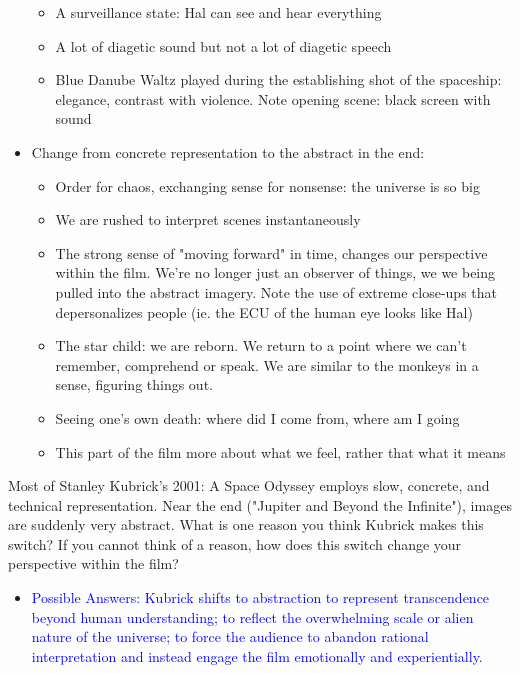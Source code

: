 \documentclass[11pt,fleqn]{book} %
\begin{document}
\begin{itemize}
\begin{itemize}
        \item A surveillance state: Hal can see and hear everything
        \item A lot of diagetic sound but not a lot of diagetic speech
        \item Blue Danube Waltz played during the establishing shot of the spaceship: elegance, contrast with violence. Note opening scene: black screen with sound
    \end{itemize}
    \item Change from concrete representation to the abstract in the end:
    \begin{itemize}
        \item Order for chaos, exchanging sense for nonsense: the universe is so big
        \item We are rushed to interpret scenes instantaneously
        \item The strong sense of "moving forward" in time, changes our perspective within the film. We're no longer just an observer of things, we we being pulled into the abstract imagery. Note the use of extreme close-ups that depersonalizes people (ie. the ECU of the human eye looks like Hal)
        \item The star child: we are reborn. We return to a point where we can't remember, comprehend or speak. We are similar to the monkeys in a sense, figuring things out. 
        \item Seeing one's own death: where did I come from, where am I going
        \item This part of the film more about what we feel, rather that what it means
    \end{itemize}
\end{itemize}
\begin{exercise}
Most of Stanley Kubrick's 2001: A Space Odyssey employs slow, concrete, and technical representation. Near the end ("Jupiter and Beyond the Infinite"), images are suddenly very abstract. What is one reason you think Kubrick makes this switch? If you cannot think of a reason, how does this switch change your perspective within the film?
\begin{itemize}
\item \textcolor{blue}{Possible Answers:  Kubrick shifts to abstraction to represent transcendence beyond human understanding; to reflect  the overwhelming scale or alien nature of the universe; to force the audience to abandon rational interpretation and instead engage the film emotionally and experientially.}
\end{itemize}
\end{exercise}
\end{document}
